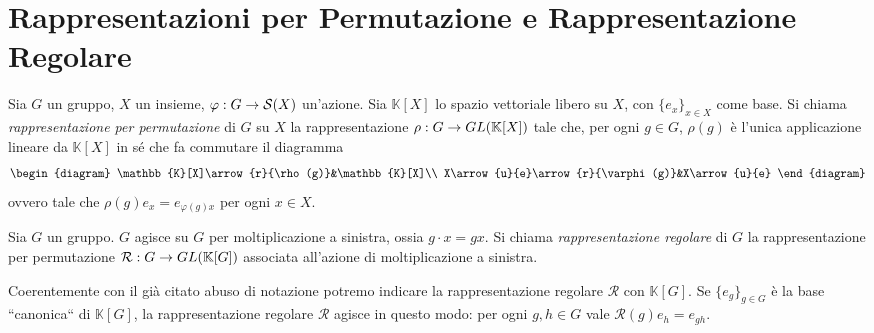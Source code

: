 \section{Rappresentazioni per Permutazione e Rappresentazione Regolare}

\begin{definition}
Sia $G$ un gruppo, $X$ un insieme, $\varphi:G\to \mathcal{S}(X)$ un'azione. Sia $\mathbb{K}[X]$ lo spazio vettoriale libero su $X$, con $\{e_x\}_{x\in X}$ come base. Si chiama \emph{rappresentazione per permutazione} di $G$ su $X$ la rappresentazione $\rho:G\to GL(\mathbb{K}[X])$ tale che, per ogni $g\in G$, $\rho(g)$ è l'unica applicazione lineare da $\mathbb{K}[X]$ in sé che fa commutare il diagramma
$$
\begin{diagram}
\mathbb{K}[X]\arrow{r}{\rho(g)}&\mathbb{K}[X]\\
X\arrow{u}{e}\arrow{r}{\varphi(g)}&X\arrow{u}{e}
\end{diagram}
$$
ovvero tale che $\rho(g)e_x=e_{\varphi(g)x}$ per ogni $x\in X$.
\end{definition}

\begin{definition}
Sia $G$ un gruppo. $G$ agisce su $G$ per moltiplicazione a sinistra, ossia $g\cdot x=gx$. Si chiama \emph{rappresentazione regolare} di $G$ la rappresentazione per permutazione $\mathcal{R}:G\to GL(\mathbb{K}[G])$ associata all'azione di moltiplicazione a sinistra.
\end{definition}

Coerentemente con il già citato abuso di notazione potremo indicare la rappresentazione regolare $\mathcal{R}$ con $\mathbb{K}[G]$. Se $\{e_g\}_{g\in G}$ è la base ``canonica`` di $\mathbb{K}[G]$, la rappresentazione regolare $\mathcal{R}$ agisce in questo modo: per ogni $g,h\in G$ vale $\mathcal{R}(g)e_h=e_{gh}$.

